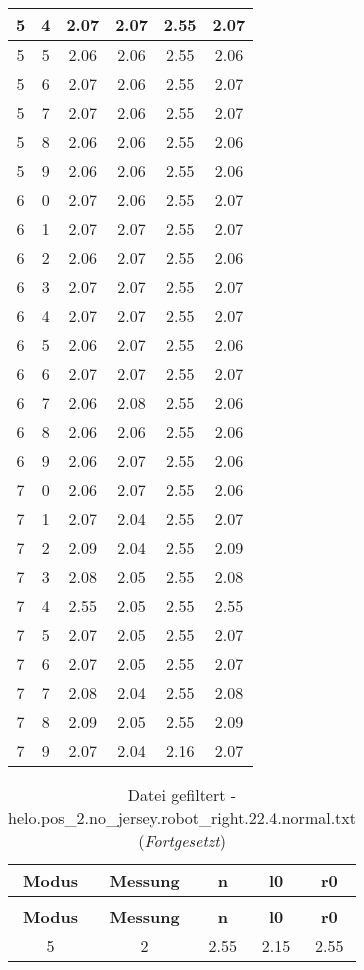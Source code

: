 \begin{longtable}{|c|c||c||c|c||c|}
	5 & 4 & 2.07 & 2.07 & 2.55 & 2.07 \\ \hline
	5 & 5 & 2.06 & 2.06 & 2.55 & 2.06 \\ \hline
	5 & 6 & 2.07 & 2.06 & 2.55 & 2.07 \\ \hline
	5 & 7 & 2.07 & 2.06 & 2.55 & 2.07 \\ \hline
	5 & 8 & 2.06 & 2.06 & 2.55 & 2.06 \\ \hline
	5 & 9 & 2.06 & 2.06 & 2.55 & 2.06 \\ \hline
	6 & 0 & 2.07 & 2.06 & 2.55 & 2.07 \\ \hline
	6 & 1 & 2.07 & 2.07 & 2.55 & 2.07 \\ \hline
	6 & 2 & 2.06 & 2.07 & 2.55 & 2.06 \\ \hline
	6 & 3 & 2.07 & 2.07 & 2.55 & 2.07 \\ \hline
	6 & 4 & 2.07 & 2.07 & 2.55 & 2.07 \\ \hline
	6 & 5 & 2.06 & 2.07 & 2.55 & 2.06 \\ \hline
	6 & 6 & 2.07 & 2.07 & 2.55 & 2.07 \\ \hline
	6 & 7 & 2.06 & 2.08 & 2.55 & 2.06 \\ \hline
	6 & 8 & 2.06 & 2.06 & 2.55 & 2.06 \\ \hline
	6 & 9 & 2.06 & 2.07 & 2.55 & 2.06 \\ \hline
	7 & 0 & 2.06 & 2.07 & 2.55 & 2.06 \\ \hline
	7 & 1 & 2.07 & 2.04 & 2.55 & 2.07 \\ \hline
	7 & 2 & 2.09 & 2.04 & 2.55 & 2.09 \\ \hline
	7 & 3 & 2.08 & 2.05 & 2.55 & 2.08 \\ \hline
	7 & 4 & 2.55 & 2.05 & 2.55 & 2.55 \\ \hline
	7 & 5 & 2.07 & 2.05 & 2.55 & 2.07 \\ \hline
	7 & 6 & 2.07 & 2.05 & 2.55 & 2.07 \\ \hline
	7 & 7 & 2.08 & 2.04 & 2.55 & 2.08 \\ \hline
	7 & 8 & 2.09 & 2.05 & 2.55 & 2.09 \\ \hline
	7 & 9 & 2.07 & 2.04 & 2.16 & 2.07 \\ \hline
\end{longtable}
\clearpage{}
\begin{longtable}{|c|c||c||c||c|}
	\caption{Datei gefiltert - helo.pos\_2.no\_jersey.robot\_right.22.4.normal.txt} \label{tab:helo.pos-2.no-jersey.robot-right.22.4.normal.txt} \\ \hline
	\textbf{Modus} & \textbf{Messung} & \textbf{n} & \textbf{l0} & \textbf{r0}\\ \hline
	\endfirsthead
	\caption[]{Datei gefiltert - helo.pos\_2.no\_jersey.robot\_right.22.4.normal.txt (\emph{Fortgesetzt})} \\ \hline
	\textbf{Modus} & \textbf{Messung} & \textbf{n} & \textbf{l0} & \textbf{r0}\\ \hline
	\endhead
	5 & 2 & 2.55 & 2.15 & 2.55 \\ \hline
\end{longtable}
